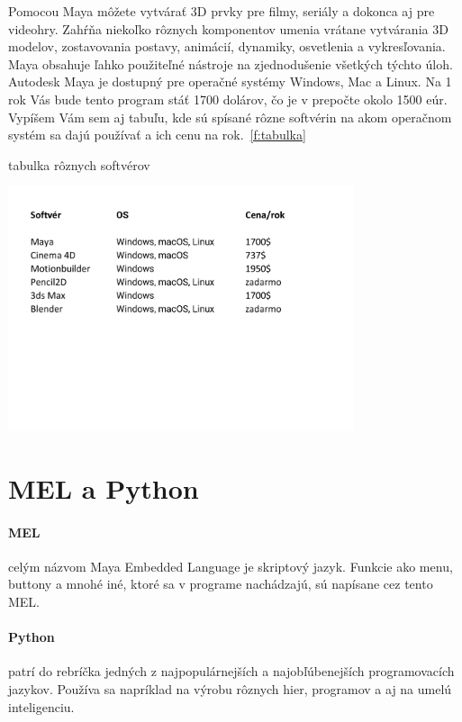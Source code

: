 \documentclass[10pt,oneside,slovak,a4paper]{article}
\begin{document}
Pomocou Maya môžete vytvárať 3D prvky pre filmy, seriály a dokonca aj pre videohry. Zahŕňa niekoľko rôznych komponentov umenia vrátane vytvárania 3D modelov, zostavovania postavy, animácií, dynamiky, osvetlenia a vykresľovania. Maya obsahuje ľahko použiteľné nástroje na zjednodušenie všetkých týchto úloh.\\

Autodesk Maya je dostupný pre operačné systémy Windows, Mac a Linux. Na 1 rok Vás bude tento program stáť 1700 dolárov, čo je v prepočte okolo 1500 eúr. Vypíšem Vám sem aj tabuľu, kde sú spísané rôzne softvérin na akom operačnom systém sa dajú používať a ich cenu na rok.~\ref{f:tabulka}

\begin{table}[h]
\centering
\caption{tabulka rôznych softvérov}
\label{f:tabulka}
\includegraphics[width=4in]{tabulka.pdf}
\end{table}




\section{MEL a Python} \label{python}
\paragraph{MEL}
celým názvom Maya Embedded Language je skriptový jazyk. Funkcie ako menu, buttony a mnohé iné, ktoré sa v programe nachádzajú, sú napísane cez tento MEL.
\paragraph{Python}
patrí do rebríčka jedných z najpopulárnejších a najobľúbenejších programovacích jazykov. Používa sa napríklad na výrobu rôznych hier, programov a aj na umelú inteligenciu.\\
\end{document}
